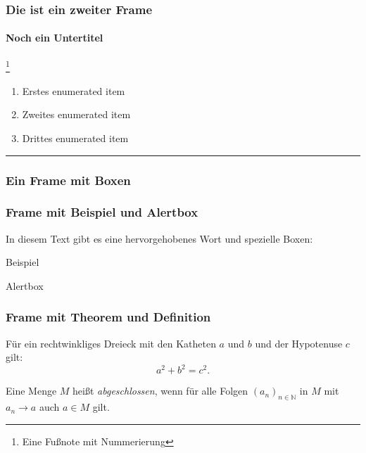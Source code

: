 \documentclass{beamer}
\begin{document}
\begin{frame}
  \frametitle{Die ist ein zweiter Frame}
  \framesubtitle{Noch ein Untertitel}
  \lipsum[2][1-3]\footnote{Eine Fußnote mit Nummerierung}

  \begin{enumerate}
    \item Erstes enumerated item
    \item Zweites enumerated item
    \item Drittes enumerated item
  \end{enumerate}

  \rule{\textwidth}{1em}

\end{frame}

\begin{frame}
  \frametitle{Ein Frame mit Boxen}
  \lipsum[1][5-6]

\end{frame}


\begin{frame}
  \frametitle{Frame mit Beispiel und Alertbox}

  In diesem Text gibt es eine \alert{hervorgehobenes} Wort und spezielle Boxen:
  \languagename

  \begin{exampleblock}{Beispiel}
    \lipsum[1][11-12]
  \end{exampleblock}
  \begin{alertblock}{Alertbox}
    \lipsum[1][13-14]
  \end{alertblock}
\end{frame}


\begin{frame}
  \frametitle{Frame mit Theorem und Definition}

  \begin{theorem}[Pythagoras]
    Für ein rechtwinkliges Dreieck mit den Katheten $a$ und $b$ und der Hypotenuse $c$ gilt:
    \[
      a^2 + b^2 = c^2.
    \]
  \end{theorem}

  \begin{definition}
    Eine Menge $M$ heißt \emph{abgeschlossen}, wenn für alle Folgen $(a_n)_{n\in\mathbb{N}}$ in $M$ mit $a_n\to a$ auch $a\in M$ gilt.
  \end{definition}

\end{frame}
\end{document}

